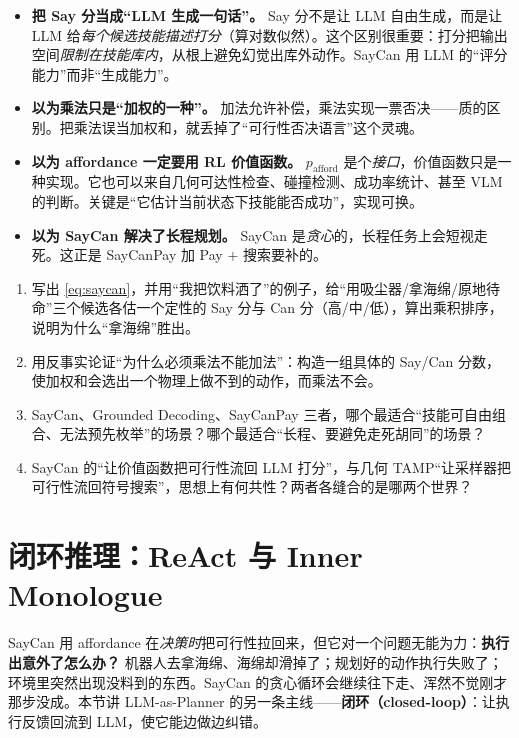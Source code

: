 \begin{pitfall}[本节常见陷阱]
\begin{itemize}
  \item \textbf{把 Say 分当成“LLM 生成一句话”。} Say 分不是让 LLM 自由生成，而是让 LLM 给\emph{每个候选技能描述打分}（算对数似然）。这个区别很重要：打分把输出空间\emph{限制在技能库内}，从根上避免幻觉出库外动作。SayCan 用 LLM 的“评分能力”而非“生成能力”。
  \item \textbf{以为乘法只是“加权的一种”。} 加法允许补偿，乘法实现一票否决——质的区别。把乘法误当加权和，就丢掉了“可行性否决语言”这个灵魂。
  \item \textbf{以为 affordance 一定要用 RL 价值函数。} $p_{\text{afford}}$ 是个\emph{接口}，价值函数只是一种实现。它也可以来自几何可达性检查、碰撞检测、成功率统计、甚至 VLM 的判断。关键是“它估计当前状态下技能能否成功”，实现可换。
  \item \textbf{以为 SayCan 解决了长程规划。} SayCan 是\emph{贪心}的，长程任务上会短视走死。这正是 SayCanPay 加 Pay $+$ 搜索要补的。
\end{itemize}
\end{pitfall}

\begin{exercise}
\begin{enumerate}
  \item 写出 \cref{eq:saycan}，并用“我把饮料洒了”的例子，给“用吸尘器/拿海绵/原地待命”三个候选各估一个定性的 Say 分与 Can 分（高/中/低），算出乘积排序，说明为什么“拿海绵”胜出。
  \item 用反事实论证“为什么必须乘法不能加法”：构造一组具体的 Say/Can 分数，使加权和会选出一个物理上做不到的动作，而乘法不会。
  \item SayCan、Grounded Decoding、SayCanPay 三者，哪个最适合“技能可自由组合、无法预先枚举”的场景？哪个最适合“长程、要避免走死胡同”的场景？
  \item SayCan 的“让价值函数把可行性流回 LLM 打分”，与几何 TAMP“让采样器把可行性流回符号搜索”，思想上有何共性？两者各缝合的是哪两个世界？
\end{enumerate}
\end{exercise}

\section{闭环推理：ReAct 与 Inner Monologue}
\label{sec:closed-loop}

SayCan 用 affordance 在\emph{决策时}把可行性拉回来，但它对一个问题无能为力：\textbf{执行出意外了怎么办？} 机器人去拿海绵、海绵却滑掉了；规划好的动作执行失败了；环境里突然出现没料到的东西。SayCan 的贪心循环会继续往下走、浑然不觉刚才那步没成。本节讲 LLM-as-Planner 的另一条主线——\textbf{闭环（closed-loop）}：让执行反馈回流到 LLM，使它能边做边纠错。


